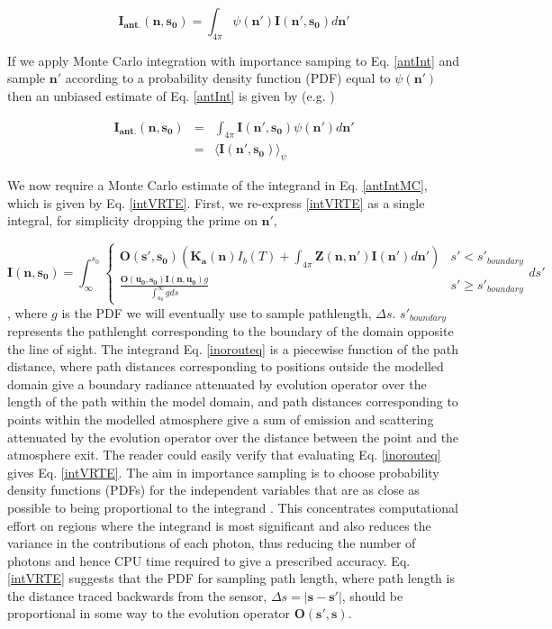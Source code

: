 \begin{equation}
\mathbf{I_{ant.}(n,s_0)}=\int_{4\pi}\psi(\mathbf{n'})\mathbf{I(n',s_0)}d\mathbf{n'}
\label{antInt}
\end{equation}

If we apply Monte Carlo integration with importance samping to
Eq. \ref{antInt} and sample $\mathbf{n'}$ according to a probability
density function (PDF) equal to $\psi(\mathbf{n'})$ then an unbiased
estimate of Eq. \ref{antInt} is given by (e.g. \cite{press:1992:numerical})

\begin{eqnarray}
\mathbf{I_{ant.}(n,s_0)}&=&\int_{4\pi}\mathbf{I(n',s_0)}\psi(\mathbf{n'})d\mathbf{n'}\\
&=&\langle \mathbf{I(n',s_0)} \rangle_\psi
\label{antIntMC}
\end{eqnarray}

We now require a Monte Carlo estimate of the integrand in
Eq. \ref{antIntMC}, which is given by Eq. \ref{intVRTE}.  First, we
re-express \ref{intVRTE} as a single integral, for simplicity dropping
the prime on $\mathbf{n'}$,

\begin{equation}
\mathbf{I(n,s_0)}=\int^{s_0}_\infty\left\{\begin{array}{rl}
\mathbf{O(s',s_0)}\left(\mathbf{K_a(n)}I_b(T)
+\int_{4\pi}\mathbf{Z(n,n')}\mathbf{I(n')}d\mathbf{n'}\right) & s'< s'_{boundary} \\
\frac{\mathbf{O(u_0,s_0)I(n,u_0)}g}{\int^\infty_{u_0}gds} & s'\ge s'_{boundary}
\end{array}ds'\right.
\label{inorouteq}
\end{equation}
, where $g$ is the PDF we will eventually use to sample pathlength,
$\Delta s$. $s'_{boundary}$ represents the pathlenght corresponding to
the boundary of the domain opposite the line of sight.
The integrand Eq. \ref{inorouteq} is a piecewise function of the
path distance, where path distances corresponding to positions outside
the modelled domain give a boundary radiance attenuated by evolution
operator over the length of the path within the model domain, and path
distances corresponding to points within the modelled atmosphere give
a sum of emission and scattering attenuated by the evolution operator
over the distance between the point and the atmosphere exit. 
The reader
could easily verify that evaluating Eq. \ref{inorouteq} gives
Eq. \ref{intVRTE}. The aim in importance sampling is to choose probability density functions
(PDFs) for the independent variables that are
as close as possible to being proportional to the integrand
\cite{liu:01}. This concentrates computational effort on regions where
the integrand is most significant and also reduces the variance in the contributions of each photon, thus reducing
the number of photons and hence CPU time required to give a
prescribed accuracy.  Eq. \ref{intVRTE} suggests that the PDF for
sampling path length, where path length is the distance traced backwards
from the sensor, $\Delta s=\left|\mathbf{s}-\mathbf{s'}\right|$, should be proportional in some way to the evolution
operator $\mathbf{O(s',s)}$. 

